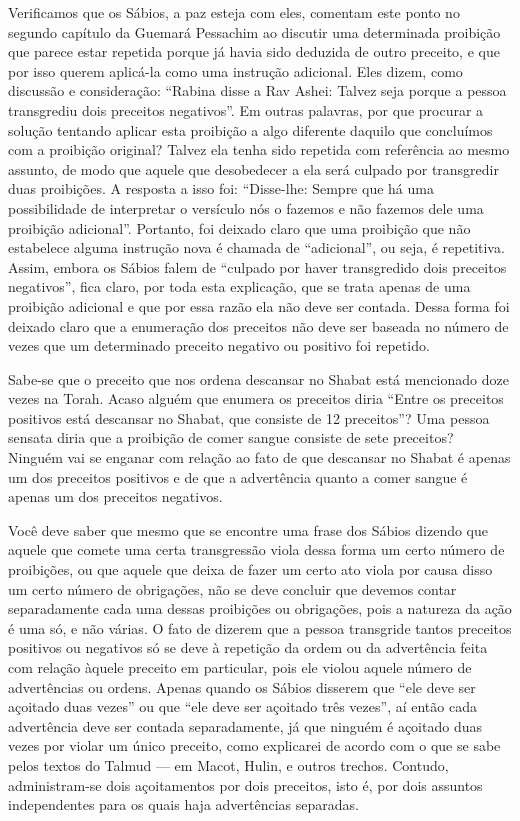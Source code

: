 Verificamos que os Sábios, a paz esteja com eles, comentam este ponto
no segundo capítulo da Guemará Pessachim ao discutir uma determinada
proibição que parece estar repetida porque já havia sido deduzida de
outro preceito, e que por isso querem aplicá-la como uma instrução
adicional. Eles dizem, como discussão e consideração: ``Rabina disse a
Rav Ashei: Talvez seja porque a pessoa transgrediu dois preceitos
negativos''. Em outras palavras, por que procurar a solução tentando
aplicar esta proibição a algo diferente daquilo que concluímos com a
proibição original? Talvez ela tenha sido repetida com referência ao
mesmo assunto, de modo que aquele que desobedecer a ela será culpado por
transgredir duas proibições. A resposta a isso foi: ``Disse-lhe: Sempre
que há uma possibilidade de interpretar o versículo nós o fazemos e não
fazemos dele uma proibição adicional''. Portanto, foi deixado claro que
uma proibição que não estabelece alguma instrução nova é chamada de
``adicional'', ou seja, é repetitiva. Assim, embora os Sábios falem de
``culpado por haver transgredido dois preceitos negativos'', fica
claro, por toda esta explicação, que se trata apenas de uma proibição
adicional e que por essa razão ela não deve ser contada. Dessa forma
foi deixado claro que a enumeração dos preceitos não deve ser baseada no
número de vezes que um determinado preceito negativo ou positivo foi
repetido.

Sabe-se que o preceito que nos ordena descansar no Shabat está
mencionado doze vezes na Torah. Acaso alguém que enumera os preceitos
diria ``Entre os preceitos positivos está descansar no Shabat, que
consiste de 12 preceitos''? Uma pessoa sensata diria que a proibição de comer sangue
consiste de sete preceitos? Ninguém vai se enganar com relação ao fato
de que descansar no Shabat é apenas um dos preceitos positivos e de que
a advertência quanto a comer sangue é apenas um dos preceitos
negativos.

Você deve saber que mesmo que se encontre uma frase dos Sábios dizendo
que aquele que comete uma certa transgressão viola dessa forma um certo
número de proibições, ou que aquele que deixa de fazer um certo ato
viola por causa disso um certo número de obrigações, não se deve
concluir que devemos contar separadamente cada uma dessas proibições ou
obrigações, pois a natureza da ação é uma só, e não várias. O fato de
dizerem que a pessoa transgride tantos preceitos positivos ou negativos
só se deve à repetição da ordem ou da advertência feita com relação
àquele preceito em particular, pois ele violou aquele número de
advertências ou ordens. Apenas quando os Sábios disserem que ``ele deve
ser açoitado duas vezes'' ou que ``ele deve ser açoitado três vezes'',
aí então cada advertência deve ser contada separadamente, já que ninguém
é açoitado duas vezes por violar um único preceito, como explicarei de
acordo com o que se sabe pelos textos do Talmud --- em Macot, Hulin, e
outros trechos. Contudo, administram-se dois açoitamentos por dois
preceitos, isto é, por dois assuntos independentes para os quais haja
advertências separadas.


